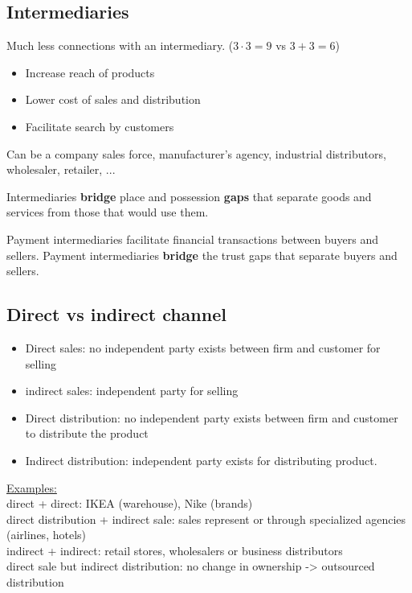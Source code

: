 \documentclass[a4paper,titlepage] {scrartcl}
\begin{document}


\subsection{Intermediaries}
Much less connections with an intermediary. ($3\cdot3=9$ vs $3+3=6$)

\begin{itemize}
	\item Increase reach of products
	\item Lower cost of sales and distribution
	\item Facilitate search by customers
\end{itemize}
 
Can be a company sales force, manufacturer's agency, industrial distributors, wholesaler, retailer, ...

Intermediaries \textbf{bridge} place and possession \textbf{gaps} that separate goods and services from those that would use them.

Payment intermediaries facilitate financial transactions between buyers and sellers. Payment intermediaries \textbf{bridge } the trust gaps that separate buyers and sellers.




\subsection{Direct vs indirect channel}

\begin{itemize}
	\item Direct sales: no independent party exists between firm and customer for selling
	\item indirect sales: independent party for selling
	\item Direct distribution: no independent party exists between firm and customer to distribute the product
	\item Indirect distribution: independent party exists for distributing product.
\end{itemize}
\underline{Examples:}\\
direct + direct: IKEA (warehouse), Nike (brands)\\
direct distribution + indirect sale: sales represent or through specialized agencies (airlines, hotels)\\
indirect + indirect: retail stores, wholesalers or business distributors\\
direct sale but indirect distribution: no change in ownership -> outsourced distribution
\end{document}
